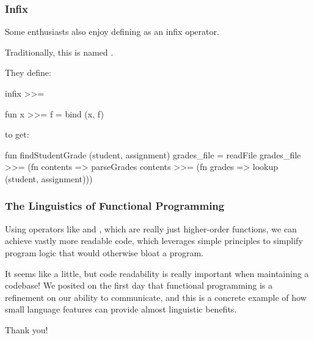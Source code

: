 \documentclass[aspectratio=169]{beamer}
\begin{document}
\begin{frame}[fragile]
  \frametitle{Infix }

  Some enthusiasts also enjoy defining  as an infix operator.

  Traditionally, this is named \code{>>=}.\footnotemark

  They define: 
  \begin{codeblock}
    infix >>=

    fun x >>= f = bind (x, f)
  \end{codeblock}

  to get:
  \begin{codeblock}
    fun findStudentGrade (student, assignment) grades_file =
      readFile grades_file >>= (fn contents =>
      parseGrades contents >>= (fn grades =>
      lookup (student, assignment)))
  \end{codeblock}

\end{frame}

\begin{frame}[fragile]
  \frametitle{The Linguistics of Functional Programming}

  Using operators like \code{>>=} and \code{|>}, which are really just
  higher-order functions, we can achieve vastly more readable code, which
  leverages simple principles to simplify program logic that would 
  otherwise bloat a program.

  It seems like a little, but code readability is really important when 
  maintaining a codebase! We posited on the first day that functional 
  programming is a refinement on our ability to communicate, and this is 
  a concrete example of how small language features can provide almost 
  linguistic benefits.
\end{frame}

\begin{frame}[plain]
	\begin{center} Thank you! \end{center}
\end{frame}
\end{document}
